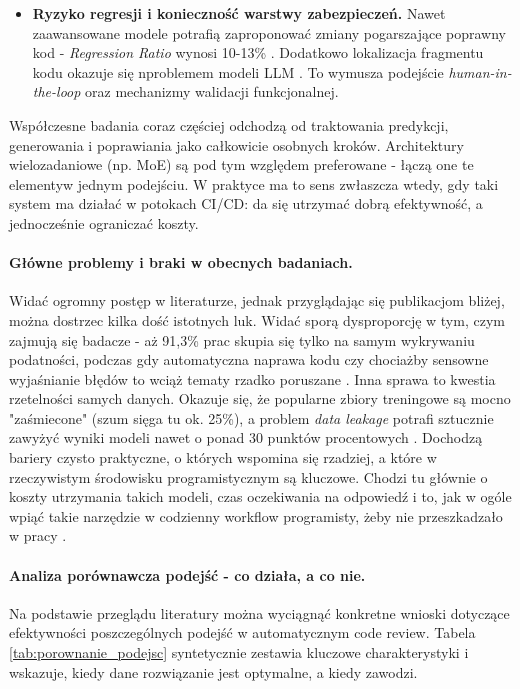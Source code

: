 \begin{itemize}
    \item \textbf{Ryzyko regresji i konieczność warstwy zabezpieczeń.} Nawet zaawansowane
modele potrafią zaproponować zmiany pogarszające poprawny kod - \emph{Regression Ratio}
wynosi 10-13\% \cite{Cihan2025EvaluatingLLMsForCodeReview}. Dodatkowo lokalizacja
fragmentu kodu okazuje się nproblemem modeli LLM \cite{Lin2025CodeReviewQA}.
To wymusza podejście \emph{human-in-the-loop} oraz mechanizmy walidacji funkcjonalnej.
\end{itemize}

Współczesne badania \cite{Tang2025MoEReviewer, Lu2023LLaMAReviewer} coraz częściej odchodzą od traktowania predykcji, generowania i poprawiania jako 
całkowicie osobnych kroków. Architektury wielozadaniowe (np. MoE) są pod tym względem preferowane - łączą 
one te elementyw jednym podejściu. W praktyce ma to sens zwłaszcza wtedy, gdy taki 
system ma działać w potokach CI/CD: da się utrzymać dobrą efektywność, a jednocześnie ograniczać 
koszty.

\paragraph{Główne problemy i braki w obecnych badaniach.}
Widać ogromny postęp w literaturze, jednak przyglądając się publikacjom bliżej, można dostrzec 
kilka dość istotnych luk. Widać sporą dysproporcję w tym, czym zajmują się 
badacze - aż 91,3\% prac skupia się tylko na samym wykrywaniu podatności, podczas gdy 
automatyczna naprawa kodu czy chociażby sensowne wyjaśnianie błędów to wciąż tematy rzadko poruszane \cite{Germano2025VulnSLR}. 
Inna sprawa to kwestia rzetelności samych danych. Okazuje się, że popularne zbiory treningowe są 
mocno "zaśmiecone" (szum sięga tu ok. 25\%), a problem \emph{data leakage} potrafi sztucznie zawyżyć 
wyniki modeli nawet o ponad 30 punktów procentowych \cite{Tufano2024CodeReviewAutomation, Germano2025VulnSLR}. Dochodzą bariery 
czysto praktyczne, o których wspomina się rzadziej, a które w rzeczywistym środowisku programistycznym są 
kluczowe. Chodzi tu głównie o koszty utrzymania takich modeli, czas oczekiwania na odpowiedź i 
to, jak w ogóle wpiąć takie narzędzie w codzienny workflow programisty, żeby nie przeszkadzało 
w pracy \cite{Ramesh2025EricssonExperience}.

\paragraph{Analiza porównawcza podejść - co działa, a co nie.}
Na podstawie przeglądu literatury można wyciągnąć konkretne wnioski dotyczące efektywności poszczególnych
podejść w automatycznym code review. Tabela \ref{tab:porownanie_podejsc} syntetycznie zestawia kluczowe
charakterystyki i wskazuje, kiedy dane rozwiązanie jest optymalne, a kiedy zawodzi.

